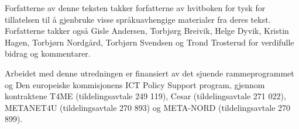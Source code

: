                                                                            
Forfatterne av denne teksten takker forfatterne av hvitboken for tysk for tillatelsen til å gjenbruke visse språkuavhengige materialer fra deres tekst. Forfatterne takker også Gisle Andersen, Torbjørg Breivik, Helge Dyvik, Kristin Hagen, Torbjørn Nordgård, Torbjørn Svendsen og Trond Trosterud for verdifulle bidrag og kommentarer.

Arbeidet med denne utredningen er finansiert av det sjuende rammeprogrammet og Den europeiske kommisjonens ICT Policy Support program, gjennom kontraktene T4ME (tildelingsavtale 249 119), Cesar (tildelingsavtale 271 022), METANET4U (tildelingsavtale 270 893) og META-NORD (tildelingsavtale 270 899).	
